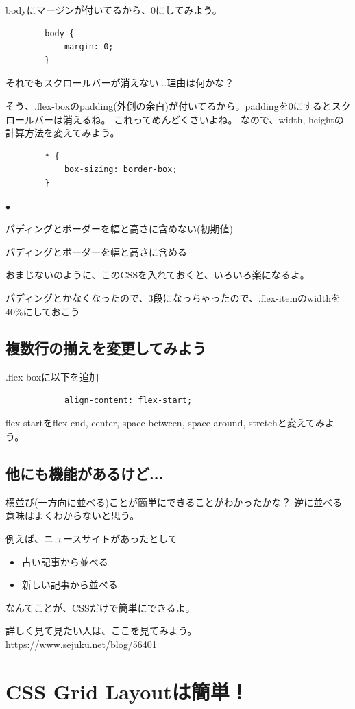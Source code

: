 \documentclass[mingoth,11pt,a4j,uplatex,dvipdfmx]{jsarticle}
\renewenvironment{description}%
{%
   \begin{list}{\parbox{1zw}{$\bullet$}}%
   {%
      \setlength{\topsep}{1zh}
      \setlength{\itemindent}{3zw}
      \setlength{\leftmargin}{5zw}%
      \setlength{\rightmargin}{0zw}%
      \setlength{\labelsep}{1zw}%
      \setlength{\labelwidth}{3zw}%
      \setlength{\itemsep}{0em}%
      \setlength{\parsep}{0em}%
      \setlength{\listparindent}{0zw}%
   }
}{%
   \end{list}%
}
\begin{document}
bodyにマージンが付いてるから、0にしてみよう。
\begin{lstlisting}
        body {
            margin: 0;
        }
\end{lstlisting}

それでもスクロールバーが消えない...理由は何かな？

そう、.flex-boxのpadding(外側の余白)が付いてるから。paddingを0にするとスクロールバーは消えるね。
これってめんどくさいよね。
なので、width, heightの計算方法を変えてみよう。
\begin{lstlisting}
        * {
            box-sizing: border-box;
        }
\end{lstlisting}
\begin{description}
\item[content-box] パディングとボーダーを幅と高さに含めない(初期値)
\item[border-box] パディングとボーダーを幅と高さに含める
\end{description}
おまじないのように、このCSSを入れておくと、いろいろ楽になるよ。

パディングとかなくなったので、3段になっちゃったので、.flex-itemのwidthを40\%にしておこう


\subsection{複数行の揃えを変更してみよう}
.flex-boxに以下を追加
\begin{lstlisting}
            align-content: flex-start;
\end{lstlisting}
flex-startをflex-end, center, space-between, space-around, stretchと変えてみよう。

\subsection{他にも機能があるけど...}
横並び(一方向に並べる)ことが簡単にできることがわかったかな？
逆に並べる意味はよくわからないと思う。

例えば、ニュースサイトがあったとして
\begin{itemize}
\item 古い記事から並べる
\item 新しい記事から並べる
\end{itemize}
なんてことが、CSSだけで簡単にできるよ。

詳しく見て見たい人は、ここを見てみよう。
https://www.sejuku.net/blog/56401


\section{CSS Grid Layoutは簡単！}
\end{document}

